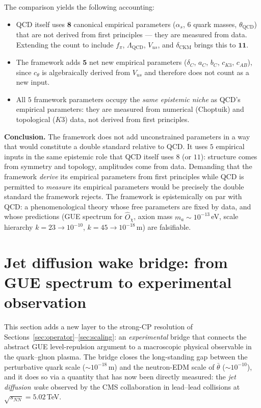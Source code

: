 \documentclass[11pt,a4paper]{article}
\newcommand{\dC}{\delta_C}
\newcommand{\Opchi}{\hat{O}_\chi}
\theoremstyle{plain}
\theoremstyle{definition}
\theoremstyle{remark}
\begin{document}
The comparison yields the following accounting:
\begin{itemize}[leftmargin=1.6em,itemsep=2pt]
  \item QCD itself uses $\boldsymbol{8}$ canonical empirical
        parameters ($\alpha_s$, $6$ quark masses, $\theta_{\mathrm{QCD}}$)
        that are not derived from first principles --- they are
        measured from data.  Extending the count to include
        $f_\pi$, $\Lambda_{\mathrm{QCD}}$, $V_{us}$, and
        $\delta_{\mathrm{CKM}}$ brings this to $\boldsymbol{11}$.
  \item The framework adds $\boldsymbol{5}$ net new empirical
        parameters ($\dC$, $a_C$, $b_C$, $c_{K3}$, $c_{AB}$),
        since $c_\theta$ is algebraically derived from $V_{us}$
        and therefore does not count as a new input.
  \item All $5$ framework parameters occupy the \emph{same
        epistemic niche} as QCD's empirical parameters: they are
        measured from numerical (Choptuik) and topological ($K3$)
        data, not derived from first principles.
\end{itemize}

\medskip\noindent
\textbf{Conclusion.}  The framework does not add unconstrained
parameters in a way that would constitute a double standard
relative to QCD.  It uses $5$ empirical inputs in the same
epistemic role that QCD itself uses $8$ (or $11$): structure
comes from symmetry and topology, amplitudes come from data.
Demanding that the framework \emph{derive} its empirical
parameters from first principles while QCD is permitted to
\emph{measure} its empirical parameters would be precisely the
double standard the framework rejects.  The framework is
epistemically on par with QCD: a phenomenological theory whose
free parameters are fixed by data, and whose predictions
(GUE spectrum for $\Opchi$, axion mass $m_a \sim 10^{-13}\,$eV,
scale hierarchy $k = 23 \to 10^{-10}$, $k = 45 \to 10^{-18}\,$m)
are falsifiable.

\section{Jet diffusion wake bridge: from GUE spectrum to experimental observation}
\label{sec:jet-wake-bridge}
This section adds a new layer to the strong-CP resolution of
Sections~\ref{sec:operator}--\ref{sec:scaling}: an \emph{experimental}
bridge that connects the abstract GUE level-repulsion argument to a
macroscopic physical observable in the quark--gluon plasma.  The bridge
closes the long-standing gap between the perturbative quark scale
($\sim 10^{-18}\,$m) and the neutron-EDM scale of $\bar\theta$
($\sim 10^{-10}$), and it does so via a quantity that has now been
directly measured: the \emph{jet diffusion wake} observed by the CMS
collaboration in lead--lead collisions at $\sqrt{s_{NN}} = 5.02\,$TeV.
\end{document}
